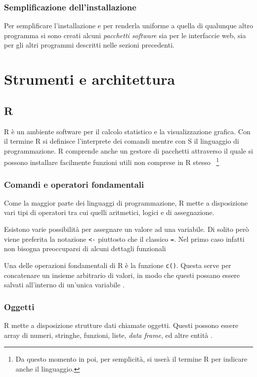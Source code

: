 \documentclass[10pt,titlepage,twoside,a4paper]{report}
\begin{document}
        \subsection{Semplificazione dell'installazione}
Per semplificare l'installazione e per renderla uniforme a quella di qualunque 
altro programma si sono creati alcuni \emph{pacchetti software} sia per 
le interfaccie web, sia per gli altri programmi descritti nelle sezioni 
precedenti.




\chapter{Strumenti e architettura}


    \section{R}
R è un ambiente software per il calcolo statistico e la 
visualizzazione grafica. Con il termine R si definisce 
l'interprete dei comandi mentre con S il linguaggio di programmazione. R 
comprende anche un gestore di pacchetti attraverso il quale si possono 
installare facilmente funzioni utili non comprese in R 
stesso \cite{rDefinition} ~\footnote{Da questo momento in poi, per semplicità, 
si userà il termine R per indicare anche il linguaggio.}

        \subsection{Comandi e operatori fondamentali}
Come la maggior parte dei linguaggi di programmazione, R mette a disposizione 
vari tipi di operatori tra cui quelli aritmetici, logici e di assegnazione.

Esistono varie possibilità per assegnare un valore ad una variabile. Di solito 
però viene preferita la notazione \texttt{<-} piuttosto che il classico 
\texttt{=}. Nel primo caso infatti non bisogna preoccuparsi di alcuni 
dettagli funzionali \cite{assignmentOperatorInR} \cite{rAssignmentOperator}

Una delle operazioni fondamentali di R è la funzione \texttt{c()}.
Questa serve per concatenare un insieme arbitrario di valori, in modo che 
questi possano essere salvati all'interno di un'unica variabile 
\cite{rVectorsAndAssignment} \cite{rConcatenatingLists}.

        \subsection{Oggetti}
R mette a disposizione strutture dati chiamate oggetti. Questi possono essere 
array di numeri, stringhe, funzioni, liste, \emph{data frame}, ed altre entità
\cite{rObject}.
\end{document}
